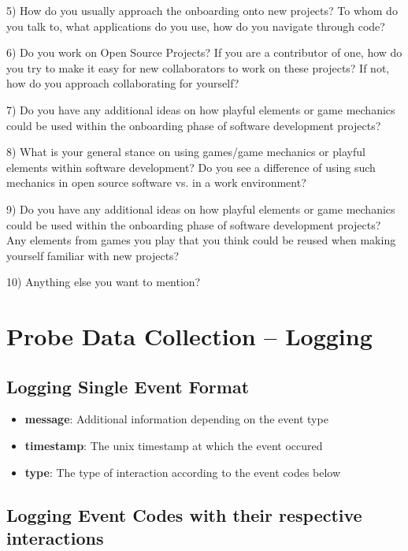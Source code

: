 \begin{appendices}
  5) How do you usually approach the onboarding onto new projects? To whom do you talk to, what applications do you use, how do you navigate through code?

  6) Do you work on Open Source Projects? If you are a contributor of one, how do you try to make it easy for new collaborators to work on these projects? If not, how do you approach collaborating for yourself?

  7) Do you have any additional ideas on how playful elements or game mechanics could be used within the onboarding phase of software development projects?

  8) What is your general stance on using games/game mechanics or playful elements within software development? Do you see a difference of using such mechanics in open source software vs. in a work environment?

  9) Do you have any additional ideas on how playful elements or game mechanics could be used within the onboarding phase of software development projects? Any elements from games you play that you think could be reused when making yourself familiar with new projects?

  10) Anything else you want to mention?

  \newpage
  \section{Probe Data Collection -- Logging}
  \label{append:collect-log}

  \subsection*{Logging Single Event Format}

  \begin{itemize}
    \item{\textbf{message}: Additional information depending on the event type}
    \item{\textbf{timestamp}: The unix timestamp at which the event occured}
    \item{\textbf{type}: The type of interaction according to the event codes below}
  \end{itemize}

  \subsection*{Logging Event Codes with their respective interactions}


\end{appendices}

